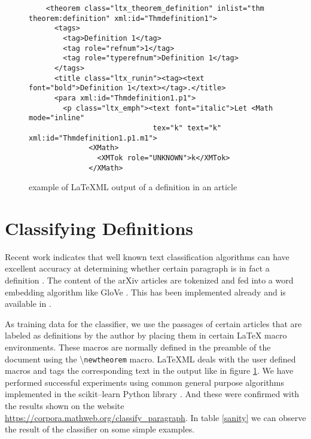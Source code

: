 \documentclass[a4paper]{easychair}
\begin{document}
\begin{center}
\begin{figure}[h]
\begin{lstlisting}
    <theorem class="ltx_theorem_definition" inlist="thm theorem:definition" xml:id="Thmdefinition1">
      <tags>
        <tag>Definition 1</tag>
        <tag role="refnum">1</tag>
        <tag role="typerefnum">Definition 1</tag>
      </tags>
      <title class="ltx_runin"><tag><text font="bold">Definition 1</text></tag>.</title>
      <para xml:id="Thmdefinition1.p1">
        <p class="ltx_emph"><text font="italic">Let <Math mode="inline" 
                             tex="k" text="k" xml:id="Thmdefinition1.p1.m1">
              <XMath>
                <XMTok role="UNKNOWN">k</XMTok>
              </XMath>
\end{lstlisting}
    \caption{\label{xml1} example of LaTeXML output of a definition in an article}
\end{figure}
\end{center}


\section{Classifying Definitions}
Recent work indicates that well known text classification algorithms \cite{bengio2003neural,chen2017improving} can have excellent accuracy  at determining whether certain paragraph is in fact a definition \cite{webscipara}. The content of the arXiv articles are tokenized and fed into a word embedding algorithm like GloVe \cite{pennington2014glove}. This has been  implemented already and is available in \cite{SML}. 

As training data for the classifier, we use the passages of certain articles that are labeled as definitions by the author by placing them in certain \LaTeX{} macro environments. These macros are normally defined in the preamble of the document using the \textbackslash \texttt{newtheorem} macro. LaTeXML deals with the user defined macros and tags the corresponding text in the output like in figure \ref{xml1}. We have performed successful experiments  using common general purpose algorithms implemented in the scikit--learn Python library \cite{scikit-learn}. And these were confirmed with the results shown on the website \url{https://corpora.mathweb.org/classify_paragraph}.
In table \ref{sanity} we can observe the result of the classifier on some simple examples.
\end{document}
